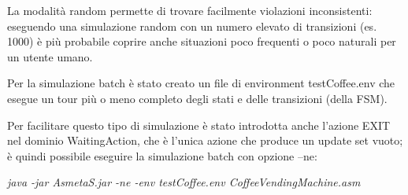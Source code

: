 La modalità random permette di trovare facilmente violazioni inconsistenti: eseguendo una simulazione random con un numero elevato di transizioni (es. 1000) è più probabile coprire anche situazioni poco frequenti o poco naturali per un utente umano.

Per la simulazione batch è stato creato un file di environment testCoffee.env che esegue un tour più o meno completo degli stati e delle transizioni (della FSM).

Per facilitare questo tipo di simulazione è stato introdotta anche l’azione EXIT nel dominio WaitingAction, che è l’unica azione che produce un update set vuoto; è quindi possibile eseguire la simulazione batch con opzione –ne:

\textit{java -jar AsmetaS.jar -ne -env testCoffee.env CoffeeVendingMachine.asm}

